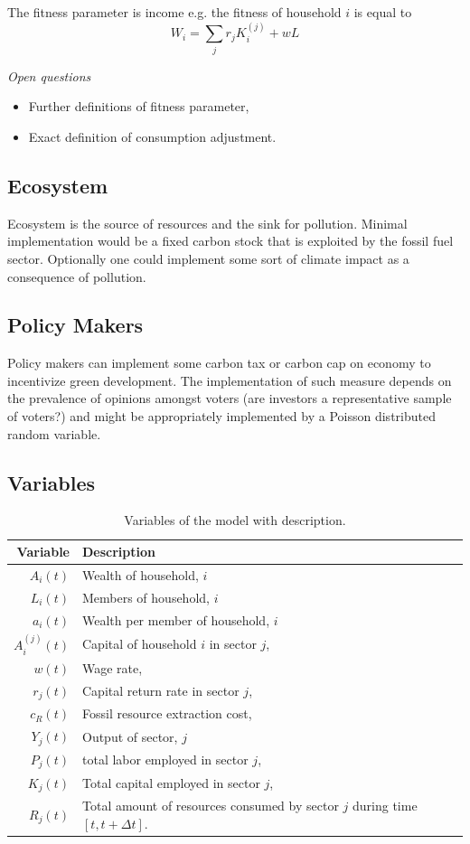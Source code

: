 The fitness parameter is income e.g. the fitness of household $i$ is equal to
\begin{equation}
	W_i = \sum_j r_j K^{(j)}_{i} + wL
	\label{eq:fitness}
\end{equation}

\textit{Open questions}
\begin{itemize}
	\item Further definitions of fitness parameter,
	\item Exact definition of consumption adjustment.
\end{itemize}

\subsection{Ecosystem}
Ecosystem is the source of resources and the sink for pollution. Minimal implementation would be a fixed carbon stock that is exploited by the fossil fuel sector. Optionally one could implement some sort of climate impact as a consequence of pollution.

\subsection{Policy Makers}
Policy makers can implement some carbon tax or carbon cap on economy to incentivize green development. The implementation of such measure depends on the prevalence of opinions amongst voters (are investors a representative sample of voters?) and might be appropriately implemented by a Poisson distributed random variable.

\subsection{Variables}

\begin{table}[H]
	\centering
	\begin{tabular}{r|l}
		Variable & Description \\\hline
		$A_i(t)$ & Wealth of household, $i$ \\
		$L_i(t)$ & Members of household, $i$ \\
		$a_i(t)$ & Wealth per member of household, $i$ \\
		$A_i^{(j)} (t)$ & Capital of household $i$ in sector $j$, \\
		$w(t)$   & Wage rate, \\
		$r_j(t)$ & Capital return rate in sector $j$, \\
		$c_R(t)$ & Fossil resource extraction cost, \\
		$Y_j(t)$ & Output of sector, $j$ \\
		$P_j(t)$ & total labor employed in sector $j$, \\
		$K_j(t)$ & Total capital employed in sector $j$, \\
		$R_j(t)$ & Total amount of resources consumed by sector $j$ during time $[t, t + \Delta t]$. \\
	\end{tabular}
	\caption{Variables of the model with description.}
	\label{tab:variables}
\end{table}

